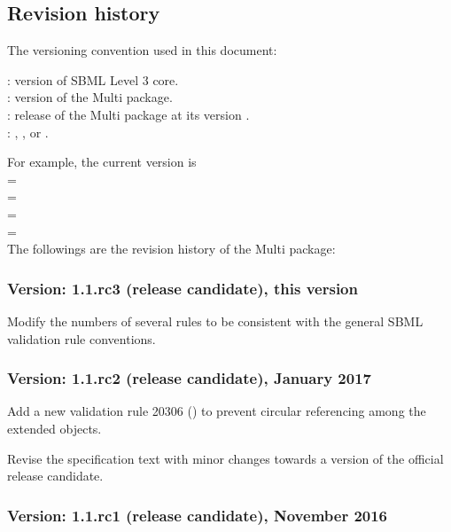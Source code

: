 \subsection{Revision history}
\label{def:revision_history}

The versioning convention used in this document: \\

: version of SBML Level 3 core. \\
: version of the Multi package. \\
: release of the Multi package at its version . \\ 
: , , or . 

For example, the current version is  \\
 =  \\
 =  \\
 =  \\
 =  \\

The followings are the revision history of the Multi package:

\subsubsection{Version: 1.1.rc3 (release candidate), this version}
\label{def:v1_1_rc3}

Modify the numbers of several rules to be consistent with the general SBML validation rule conventions. 

\subsubsection{Version: 1.1.rc2 (release candidate), January 2017}
\label{def:v1_1_rc2}

Add a new validation rule 20306 () to prevent circular referencing among the extended \ExCompartment objects.

Revise the specification text with minor changes towards a version of the official release candidate. 

\subsubsection{Version: 1.1.rc1 (release candidate), November 2016}
\label{def:v1_1_rc1}

